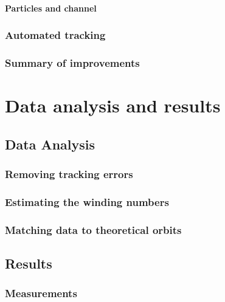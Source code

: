 \documentclass[]{report}
\begin{document}
\subsection{Particles and channel}




\section{Automated tracking}
     

\section{Summary of improvements}



\part{Data analysis and results}
\chapter{Data Analysis}


\section{Removing tracking errors}


\section{Estimating the winding numbers}


\section{Matching data to theoretical orbits}



\chapter{Results}

\section{Measurements}

\end{document}
